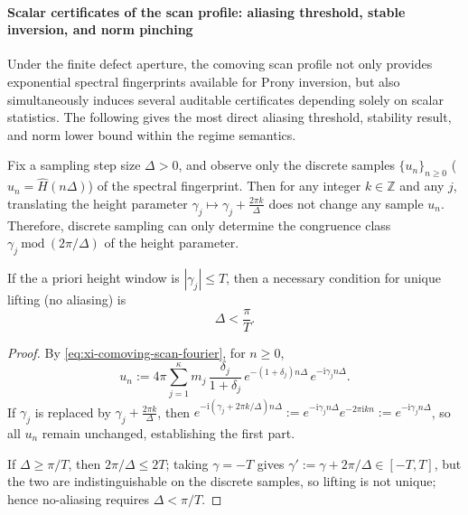 \paragraph{Scalar certificates of the scan profile: aliasing threshold, stable inversion, and norm pinching}
Under the finite defect aperture, the comoving scan profile not only provides exponential spectral fingerprints available for Prony inversion, but also simultaneously induces several auditable certificates depending solely on scalar statistics.
The following gives the most direct aliasing threshold, stability result, and norm lower bound within the regime semantics.

\begin{proposition}\label{prop:xi-scan-aliasing-threshold}
Fix a sampling step size \(\Delta>0\), and observe only the discrete samples \(\{u_n\}_{n\ge 0}\) (\(u_n=\widehat H(n\Delta)\)) of the spectral fingerprint.
Then for any integer \(k\in\mathbb{Z}\) and any \(j\), translating the height parameter
\(
\gamma_j\mapsto \gamma_j+\frac{2\pi k}{\Delta}
\)
does not change any sample \(u_n\).
Therefore, discrete sampling can only determine the congruence class \(\gamma_j\ \mathrm{mod}\ (2\pi/\Delta)\) of the height parameter.
\par
If the a priori height window is \(|\gamma_j|\le T\), then a necessary condition for unique lifting (no aliasing) is
\[
\boxed{\;\Delta<\frac{\pi}{T}.\;}
\]
\end{proposition}

\begin{proof}
By \eqref{eq:xi-comoving-scan-fourier}, for \(n\ge 0\),
\[
u_n
:=4\pi\sum_{j=1}^{\kappa}m_j\,\frac{\delta_j}{1+\delta_j}\,e^{-(1+\delta_j)n\Delta}\,e^{-\mathrm{i}\gamma_j n\Delta}.
\]
If \(\gamma_j\) is replaced by \(\gamma_j+\frac{2\pi k}{\Delta}\), then
\(
e^{-\mathrm{i}(\gamma_j+2\pi k/\Delta)n\Delta}
:=e^{-\mathrm{i}\gamma_j n\Delta}e^{-2\pi\mathrm{i}kn}
:=e^{-\mathrm{i}\gamma_j n\Delta}
\),
so all \(u_n\) remain unchanged, establishing the first part.
\par
If \(\Delta\ge \pi/T\), then \(2\pi/\Delta\le 2T\); taking \(\gamma=-T\) gives \(\gamma':=\gamma+2\pi/\Delta\in[-T,T]\),
but the two are indistinguishable on the discrete samples, so lifting is not unique; hence no-aliasing requires \(\Delta<\pi/T\). \qedhere
\end{proof}

